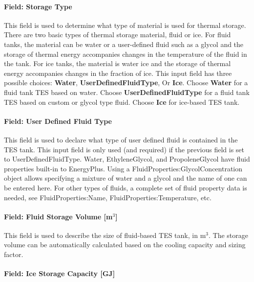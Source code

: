 \paragraph{Field: Storage Type}\label{field-storage-type}

This field is used to determine what type of material is used for thermal storage. There are two basic types of thermal storage material, fluid or ice. For fluid tanks, the material can be water or a user-defined fluid such as a glycol and the storage of thermal energy accompanies changes in the temperature of the fluid in the tank. For ice tanks, the material is water ice and the storage of thermal energy accompanies changes in the fraction of ice. This input field has three possible choices: \textbf{Water}, \textbf{UserDefinedFluidType}, Or \textbf{Ice}. Choose \textbf{Water} for a fluid tank TES based on water. Choose \textbf{UserDefinedFluidType} for a fluid tank TES based on custom or glycol type fluid. Choose \textbf{Ice} for ice-based TES tank.

\paragraph{Field: User Defined Fluid Type}\label{field-user-defined-fluid-type}

This field is used to declare what type of user defined fluid is contained in the TES tank. This input field is only used (and required) if the previous field is set to UserDefinedFluidType. Water, EthyleneGlycol, and PropoleneGlycol have fluid properties built-in to EnergyPlus. Using a FluidProperties:GlycolConcentration object allows specifying a mixture of water and a glycol and the name of one can be entered here. For other types of fluids, a complete set of fluid property data is needed, see FluidProperties:Name, FluidProperties:Temperature, etc.

\paragraph{Field: Fluid Storage Volume {[}m\(^{3}\){]}}\label{field-fluid-storage-volume-m3}

This field is used to describe the size of fluid-based TES tank, in m\(^{3}\). The storage volume can be automatically calculated based on the cooling capacity and sizing factor.

\paragraph{Field: Ice Storage Capacity {[}GJ{]}}\label{field-ice-storage-capacity-gj}

